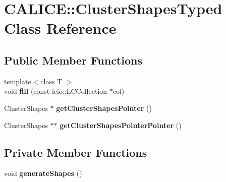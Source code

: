 \section{C\-A\-L\-I\-C\-E\-:\-:Cluster\-Shapes\-Typed Class Reference}
\label{classCALICE_1_1ClusterShapesTyped}
\subsection*{Public Member Functions}
\begin{DoxyCompactItemize}
\item 
{\footnotesize template$<$class T $>$ }\\void {\bfseries fill} (const lcio\-::\-L\-C\-Collection $\ast$col)\label{classCALICE_1_1ClusterShapesTyped_a4e83529f57aab8f0c3ba1a014868e861}

\item 
Cluster\-Shapes $\ast$ {\bfseries get\-Cluster\-Shapes\-Pointer} ()\label{classCALICE_1_1ClusterShapesTyped_a856df7a286fb0facfd9a87ae11286ec9}

\item 
Cluster\-Shapes $\ast$$\ast$ {\bfseries get\-Cluster\-Shapes\-Pointer\-Pointer} ()\label{classCALICE_1_1ClusterShapesTyped_a9d3fabcc3aebb217c7c5673c077bb4ea}

\end{DoxyCompactItemize}
\subsection*{Private Member Functions}
\begin{DoxyCompactItemize}
\item 
void {\bfseries generate\-Shapes} ()\label{classCALICE_1_1ClusterShapesTyped_a0526e8ad7d133ee4b3fee30d13f72d66}

\end{DoxyCompactItemize}

